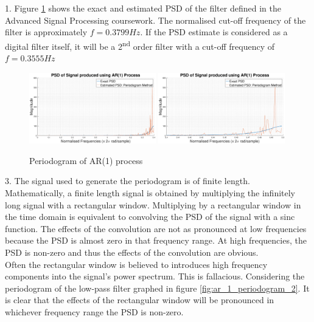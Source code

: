 \documentclass{article}
\begin{document}
1. Figure \ref{fig:ar_1_periodogram} shows the exact and estimated PSD of the filter defined in the Advanced Signal Processing coursework. The normalised cut-off frequency of the filter is approximately $f=0.3799Hz$. If the PSD estimate is considered as a digital filter itself, it will be a 2\textsuperscript{nd} order filter with a cut-off frequency of $f=0.3555Hz$ 

\begin{figure}[H]
    \centering
    \includegraphics[width=0.49\textwidth]{ar_1_process_estimate_and_ideal}
    \includegraphics[width=0.49\textwidth]{ar_1_process_estimate_and_ideal_zoom}
    \caption{Periodogram of AR(1) process}
    \label{fig:ar_1_periodogram}
\end{figure}

3. The signal used to generate the periodogram is of finite length. Mathematically, a finite length signal is obtained by multiplying the infinitely long signal with a rectangular window. Multiplying by a rectangular window in the time domain is equivalent to convolving the PSD of the signal with a sinc function. The effects of the convolution are not as pronounced at low frequencies because the PSD is almost zero in that frequency range. At high frequencies, the PSD is non-zero and thus the effects of the convolution are obvious.\\

Often the rectangular window is believed to introduces high frequency components into the signal's power spectrum. This is fallacious. Considering the periodogram of the low-pass filter graphed in figure \ref{fig:ar_1_periodogram_2}. It is clear that the effects of the rectangular window will be pronounced in whichever frequency range the PSD is non-zero. 
\end{document}
